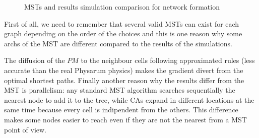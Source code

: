\begin{figure}[H]
    \caption{MSTs and results simulation comparison for network formation}
    \label{fig:mst_20_40}
\end{figure}

\par
First of all, we need to remember that several valid MSTs can exist for each graph depending on the order of the choices and this is one reason why some archs of the MST are different compared to the results of the simulations.

\par
The diffusion of the $PM$ to the neighbour cells following approximated rules (less accurate than the real Physarum physics) makes the gradient divert from the optimal shortest paths.
Finally another reason why the results differ from the MST is parallelism: any standard MST algorithm searches sequentially the nearest node to add it to the tree, while CAs expand in different locations at the same time because every cell is indipendent from the others. This difference makes some nodes easier to reach even if they are not the nearest from a MST point of view.

